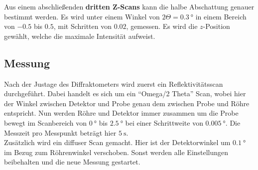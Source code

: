         \noindent Aus einem abschließenden \textbf{dritten Z-Scans} kann die halbe Abschattung genauer bestimmt werden. Es wird unter einem Winkel von 
        $2 \Theta = \SI{0.3}{\degree}$ in einem Bereich von $\num{-0.5}$ bis $\num{0.5}$, mit Schritten von $\num{0.02}$,  gemessen. Es wird die $z$-Position 
        gewählt, welche die maximale Intensität aufweist. 

    \subsection{Messung}

        \noindent Nach der Justage des Diffraktometers wird zuerst ein Reflektivitätsscan durchgeführt. Dabei handelt es sich um ein 
        \enquote{Omega/2 Theta} Scan, wobei hier der Winkel zwischen Detektor und Probe genau dem zwischen Probe und Röhre entspricht. 
        Nun werden Röhre und Detektor immer zusammen um die Probe bewegt im Scanbereich von $\SI{0}{\degree}$ bis $\SI{2.5}{\degree}$ bei einer
        Schrittweite von $\SI{0.005}{\degree}$. Die Messzeit pro Messpunkt beträgt hier $\SI{5}{\second}$. \\
        Zusätzlich wird ein diffuser Scan gemacht. Hier ist der Detektorwinkel um $\SI{0.1}{\degree}$ im Bezug zum Röhrenwinkel verschoben. 
        Sonst werden alle Einstellungen beibehalten und die neue Messung gestartet. 
  